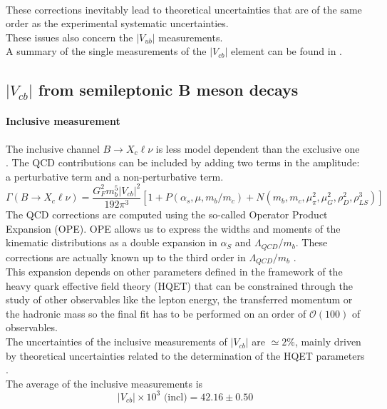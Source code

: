 \\
These corrections inevitably lead to theoretical uncertainties that are of the same order as the experimental systematic uncertainties.\\
These issues also concern the $|V_{ub}|$ measurements.\\
A summary of the single measurements of the $|V_{cb}|$ element can be found in \cite{PDG_2022}.
\subsection{$|V_{cb}|$ from semileptonic B meson decays}
\paragraph*{Inclusive measurement}
The inclusive channel $B\to X_c \ell \nu$ is less model dependent than the exclusive one \cite{Smith2005DeterminationSpectra}.
The QCD contributions can be included by adding two terms in the amplitude: a perturbative term and a non-perturbative term.
\begin{equation}
    \Gamma(B\rightarrow X_c\ell\nu)=\frac{G_{F}^{2}m_{b}^{5}|V_{c b}|^{2}}{192\pi^{3}}[1+P(\alpha_{s},\mu,m_{b}/m_{c})+N(m_b,m_c,\mu_\pi^2,\mu_G^2,\rho_D^2,\rho_{LS}^3)]
\end{equation}
The QCD corrections are computed using the so-called Operator Product Expansion (OPE). OPE allows us to express the widths and moments of the kinematic distributions as a double expansion in $\alpha_S$ and $\Lambda_{QCD}/m_b$. These corrections are actually known up to the third order in $\Lambda_{QCD}/m_b$ \cite{Alberti2016TheVcb}.\\
This expansion depends on other parameters defined in the framework of the heavy quark effective field theory (HQET) that can be constrained through the study of other observables like the lepton energy, the transferred momentum or the hadronic mass \cite{Smith2005DeterminationSpectra} so the final fit has to be performed on an order of $\mathcal{O}(100)$ of observables.\\
The uncertainties of the inclusive measurements of $|V_{cb}|$ are  $\simeq 2\%$, mainly driven by theoretical uncertainties related to the determination of the HQET parameters \cite{Alberti2016TheVcb}.\\
The average of the inclusive measurements is \cite{Bordone2021ThreeVcb}
\begin{equation}
    |V_{cb}|\times10^3\text{ (incl)}=42.16\pm 0.50
\end{equation}

